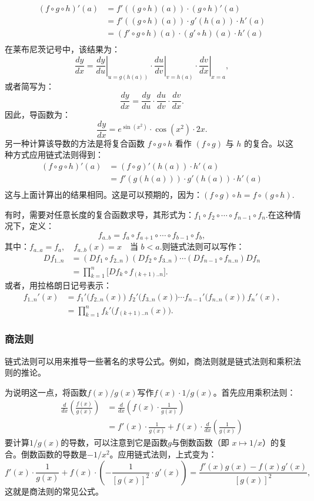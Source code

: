 $$
\begin{aligned}
(f \circ g \circ h)'(a) 
&= f'((g \circ h)(a)) \cdot (g \circ h)'(a)\\
&= f'((g \circ h)(a)) \cdot g'(h(a)) \cdot h'(a)\\
&= (f' \circ g \circ h)(a) \cdot (g' \circ h)(a) \cdot h'(a)\\
\end{aligned}~
$$
在莱布尼茨记号中，该结果为：
$$
\frac{dy}{dx} = \left.\frac{dy}{du}\right|_{u=g(h(a))} \cdot \left.\frac{du}{dv}\right|_{v=h(a)} \cdot \left.\frac{dv}{dx}\right|_{x=a},~
$$
或者简写为：
$$
\frac{dy}{dx} = \frac{dy}{du} \cdot \frac{du}{dv} \cdot \frac{dv}{dx}.~
$$
因此，导函数为：
$$
\frac{dy}{dx} = e^{\sin(x^2)} \cdot \cos(x^2) \cdot 2x.~
$$
另一种计算该导数的方法是将复合函数 $f \circ g \circ h$ 看作 $(f \circ g)$ 与 $h$ 的复合。以这种方式应用链式法则得到：
$$
\begin{aligned}
(f \circ g \circ h)'(a) &= (f \circ g)'(h(a)) \cdot h'(a)\\
&= f'(g(h(a))) \cdot g'(h(a)) \cdot h'(a)\\
\end{aligned}~
$$
这与上面计算出的结果相同。这是可以预期的，因为：$(f \circ g) \circ h = f \circ (g \circ h)$.

有时，需要对任意长度的复合函数求导，其形式为：$f_{1} \circ f_{2} \circ \cdots \circ f_{n-1} \circ f_{n}$.在这种情况下，定义：
$$
f_{a..b} = f_a \circ f_{a+1} \circ \cdots \circ f_{b-1} \circ f_b,~
$$
其中：$f_{a..a} = f_a, \quad f_{a..b}(x) = x \quad \text{当 } b < a$.则链式法则可以写作：
$$
\begin{aligned}
Df_{1..n} &= (Df_1 \circ f_{2..n})(Df_2 \circ f_{3..n}) \cdots (Df_{n-1} \circ f_{n..n}) Df_n\\
&= \prod_{k=1}^{n} \big[ Df_k \circ f_{(k+1)..n} \big].
\end{aligned}~
$$
或者，用拉格朗日记号表示：
$$
\begin{aligned}
f_{1..n}'(x) &= f_1'\!\big(f_{2..n}(x)\big) \; f_2'\!\big(f_{3..n}(x)\big) \cdots f_{n-1}'\!\big(f_{n..n}(x)\big) \; f_n'(x),\\
&= \prod_{k=1}^{n} f_k'\!\big(f_{(k+1)..n}(x)\big).
\end{aligned}~
$$
\subsubsection{商法则}
链式法则可以用来推导一些著名的求导公式。例如，商法则就是链式法则和乘积法则的推论。

为说明这一点，将函数$f(x)/g(x)$写作$f(x) \cdot 1/g(x)$。首先应用乘积法则：
$$
\begin{aligned}
\frac{d}{dx}\left(\frac{f(x)}{g(x)}\right) 
&= \frac{d}{dx}\left(f(x) \cdot \frac{1}{g(x)}\right)\\
&= f'(x)\cdot \frac{1}{g(x)} + f(x)\cdot \frac{d}{dx}\left(\frac{1}{g(x)}\right)
\end{aligned}~
$$
要计算$1/g(x)$的导数，可以注意到它是函数$g$与倒数函数（即 $x \mapsto 1/x$）的复合。倒数函数的导数是$-1/x^2$。应用链式法则，上式变为：
$$
f'(x)\cdot \frac{1}{g(x)} + f(x)\cdot \left(-\frac{1}{[g(x)]^2}\cdot g'(x)\right)
= \frac{f'(x)g(x) - f(x)g'(x)}{[g(x)]^2},~
$$
这就是商法则的常见公式。

